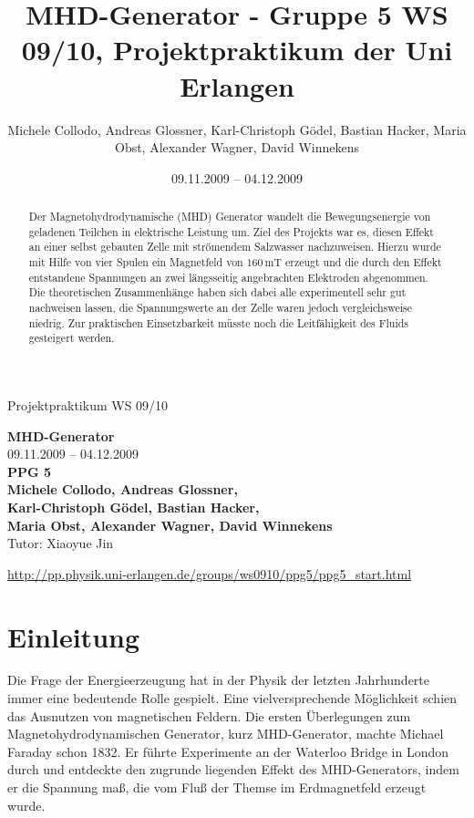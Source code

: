 \documentclass[11pt]{scrartcl}
\title{MHD-Generator - Gruppe 5 WS 09/10, Projektpraktikum der Uni Erlangen}
\date{09.11.2009 -- 04.12.2009}
\author{Michele Collodo, Andreas Glossner, Karl-Christoph G\"odel, Bastian Hacker, Maria Obst, Alexander Wagner, David Winnekens}
\newcommand{\unit}[1]{\ensuremath{\,\mathrm{#1}}} %
\begin{document}
\sloppy %
\thispagestyle{empty}
\large{Projektpraktikum WS 09/10}
\hfill
{}
\\[8\baselineskip]
\begin{center}
{\fontsize{36}{54}\textbf{MHD-Generator}}
\\[2\baselineskip]
{\Large 09.11.2009 -- 04.12.2009}
\\[7\baselineskip]
{\huge\textbf{PPG 5}}
\\[0.5\baselineskip]
{\large\textbf{
Michele Collodo,
Andreas Glossner,\\
Karl-Christoph G\"odel,
Bastian Hacker,\\
Maria Obst,
Alexander Wagner,
David Winnekens}\\
Tutor: Xiaoyue Jin}
\vfill



\small{\url{http://pp.physik.uni-erlangen.de/groups/ws0910/ppg5/ppg5\_start.html}}
\end{center}
\newpage



\tableofcontents
\vfill



\begin{abstract}
Der Magnetohydrodynamische (MHD) Generator wandelt die Bewegungsenergie von geladenen Teilchen in elektrische Leistung um. Ziel des Projekts war es, diesen Effekt an einer selbst gebauten Zelle mit strömendem Salzwasser nachzuweisen. Hierzu wurde mit Hilfe von vier Spulen ein Magnetfeld von $160 \unit{mT}$ erzeugt und die durch den Effekt entstandene Spannungen an zwei längsseitig angebrachten Elektroden abgenommen. Die theoretischen Zusammenhänge haben sich dabei alle experimentell sehr gut nachweisen lassen, die Spannungswerte an der Zelle waren jedoch vergleichsweise niedrig. Zur praktischen Einsetzbarkeit müsste noch die Leitfähigkeit des Fluids gesteigert werden.
\end{abstract}
\newpage


\section{Einleitung}	%
Die Frage der Energieerzeugung hat in der Physik der letzten Jahrhunderte immer eine bedeutende Rolle gespielt. Eine vielversprechende M\"oglichkeit schien das Ausnutzen von magnetischen Feldern. Die ersten \"Uberlegungen zum Magnetohydrodynamischen Generator, kurz MHD-Generator, machte Michael Faraday schon 1832. Er führte Experimente an der Waterloo Bridge in London durch und entdeckte den zugrunde liegenden Effekt des MHD-Generators, indem er die Spannung maß, die vom Fluß der Themse im Erdmagnetfeld erzeugt wurde.
\end{document}
